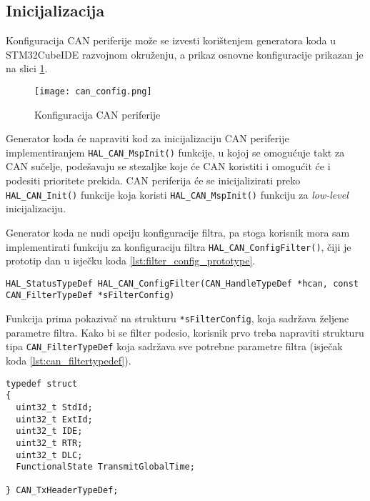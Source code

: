 \subsection{Inicijalizacija}

Konfiguracija CAN periferije može se izvesti korištenjem generatora koda u \\STM32CubeIDE razvojnom okruženju, a prikaz osnovne konfiguracije prikazan je na slici \ref{fig:can_config}.

\begin{figure}[H]
	\centering
	\texttt{[image: can\_config.png]}
	\caption{Konfiguracija CAN periferije}
	\label{fig:can_config}
\end{figure}

\noindent Generator koda će napraviti kod za inicijalizaciju CAN periferije implementiranjem \verb|HAL_CAN_MspInit()| funkcije, u kojoj se omogućuje takt za CAN sučelje, podešavaju se stezaljke koje će CAN koristiti i omogućit će i podesiti prioritete prekida. CAN periferija će se inicijalizirati preko \verb|HAL_CAN_Init()| funkcije koja koristi \verb|HAL_CAN_MspInit()| funkciju za \textit{low-level} inicijalizaciju.

Generator koda ne nudi opciju konfiguracije filtra, pa stoga korisnik mora sam implementirati funkciju za konfiguraciju filtra \verb|HAL_CAN_ConfigFilter()|, čiji je prototip dan u isječku koda \ref{lst:filter_config_prototype}.

\begin{lstlisting}[caption=Prototip funkcije HAL\_CAN\_ConfigFilter(), label={fig:filter_config_prototype}]
HAL_StatusTypeDef HAL_CAN_ConfigFilter(CAN_HandleTypeDef *hcan, const CAN_FilterTypeDef *sFilterConfig)
\end{lstlisting} 

\noindent Funkcija prima pokazivač na strukturu \verb|*sFilterConfig|, koja sadržava željene parametre filtra. Kako bi se filter podesio, korisnik prvo treba napraviti strukturu tipa \verb|CAN_FilterTypeDef| koja sadržava sve potrebne parametre filtra (isječak koda \ref{lst:can_filtertypedef}).

\begin{lstlisting}[caption=CAN\_FilterTypeDef struktura, label={lst:can_filtertypedef}]
typedef struct
{
  uint32_t StdId;
  uint32_t ExtId;
  uint32_t IDE;
  uint32_t RTR;
  uint32_t DLC;
  FunctionalState TransmitGlobalTime;

} CAN_TxHeaderTypeDef;
\end{lstlisting}

